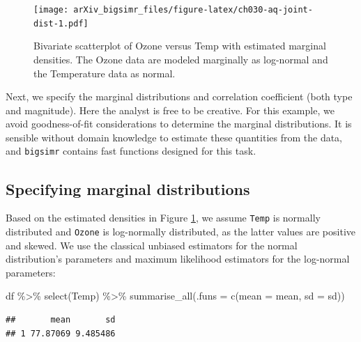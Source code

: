 \documentclass{article}
\newenvironment{Shaded}{\begin{snugshade}}{\end{snugshade}}
\newcommand{\AttributeTok}[1]{\textcolor[rgb]{0.77,0.63,0.00}{#1}}
\newcommand{\FunctionTok}[1]{\textcolor[rgb]{0.00,0.00,0.00}{#1}}
\newcommand{\NormalTok}[1]{#1}
\newcommand{\SpecialCharTok}[1]{\textcolor[rgb]{0.00,0.00,0.00}{#1}}
\begin{document}
\begin{figure}
\centering
\texttt{[image: arXiv\_bigsimr\_files/figure-latex/ch030-aq-joint-dist-1.pdf]}
\caption{\label{fig:ch030-aq-joint-dist}Bivariate scatterplot of Ozone
versus Temp with estimated marginal densities. The Ozone data are
modeled marginally as log-normal and the Temperature data as normal.}
\end{figure}

Next, we specify the marginal distributions and correlation coefficient
(both type and magnitude). Here the analyst is free to be creative. For
this example, we avoid goodness-of-fit considerations to determine the
marginal distributions. It is sensible without domain knowledge to
estimate these quantities from the data, and \texttt{bigsimr} contains
fast functions designed for this task.

\hypertarget{specifying-marginal-distributions}{%
\subsection{Specifying marginal
distributions}\label{specifying-marginal-distributions}}

Based on the estimated densities in Figure
\ref{fig:ch030-aq-joint-dist}, we assume \texttt{Temp} is normally
distributed and \texttt{Ozone} is log-normally distributed, as the
latter values are positive and skewed. We use the classical unbiased
estimators for the normal distribution's parameters and maximum
likelihood estimators for the log-normal parameters:

\begin{Shaded}
\begin{Highlighting}[]
\NormalTok{df }\SpecialCharTok{\%\textgreater{}\%} \FunctionTok{select}\NormalTok{(Temp) }\SpecialCharTok{\%\textgreater{}\%} 
  \FunctionTok{summarise\_all}\NormalTok{(}\AttributeTok{.funs =} \FunctionTok{c}\NormalTok{(}\AttributeTok{mean =}\NormalTok{ mean, }\AttributeTok{sd =}\NormalTok{ sd))}
\end{Highlighting}
\end{Shaded}

\begin{verbatim}
##       mean       sd
## 1 77.87069 9.485486
\end{verbatim}
\end{document}
